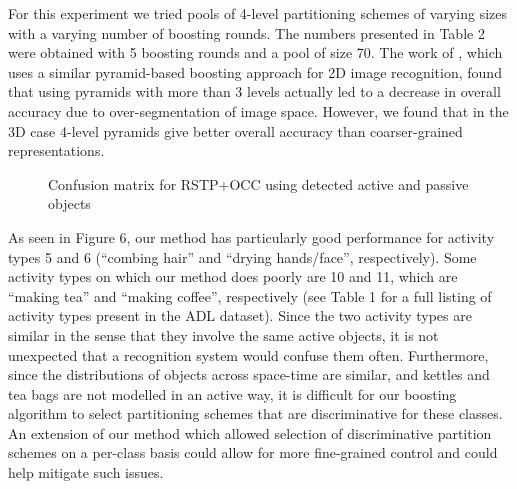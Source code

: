 \documentclass{bmvc2k}
\begin{document}
	For this experiment we tried pools of 4-level partitioning schemes of
  varying sizes with a varying number of boosting rounds. The numbers
  presented in Table 2 were obtained with 5 boosting rounds and a pool of
  size 70.
  The work of \cite{Jiang12}, which uses a similar
  pyramid-based boosting approach for 2D image recognition, found that using
  pyramids with more than 3 levels actually led to a decrease in overall
  accuracy due to over-segmentation of image space. However, we found that in the
  3D case 4-level pyramids give better overall accuracy than coarser-grained
  representations.


  
  \begin{figure}
  \begin{center}
		   \caption{Confusion matrix for RSTP+OCC using detected active and
       passive objects}
  \label{fig:teaser}
  \end{center}
  \end{figure}
 	As seen in Figure 6, our method has particularly good
  performance for activity types 5 and 6 (``combing hair'' and ``drying
  hands/face'', respectively). Some activity types on which our method does
  poorly are 10 and 11, which are ``making tea'' and ``making coffee'',
  respectively (see Table 1 for a full listing of activity types present in
  the ADL dataset). Since the two activity types are similar in the sense that
  they involve the same active objects, it is not
  unexpected that a recognition system would confuse them often.
  Furthermore, since the distributions of objects across space-time are
  similar, and kettles and tea bags are not modelled in an active way, it is
  difficult for our boosting algorithm to select partitioning schemes that
  are discriminative for these classes. An extension of our method which
  allowed selection of discriminative partition schemes on a per-class basis
  could allow for more fine-grained control and could help mitigate such
  issues.
\end{document}
